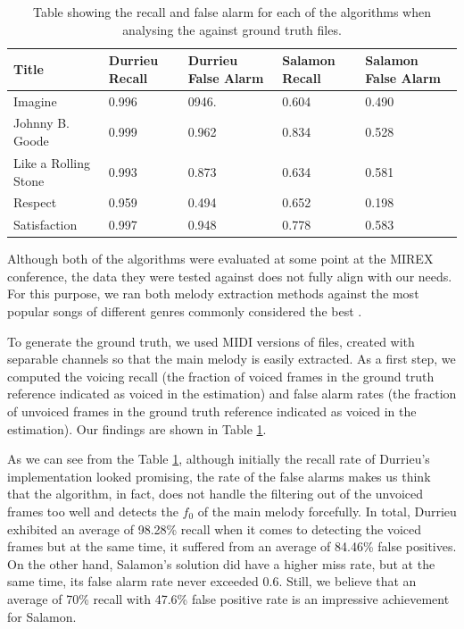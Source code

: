 \begin{table}[b]
\begin{center}
\begin{tabular} {| p{5cm}| p{1.75cm} | p{1.75cm} | p{1.75cm} | p{1.75cm} |} \hline
Title 	& Durrieu Recall & Durrieu False Alarm 	& Salamon Recall 	& Salamon False Alarm \\ \hline \hline
Imagine						& 0.996		& 0946.		& 0.604			& 0.490		\\	\hline
Johnny B. Goode		& 0.999		& 0.962		& 0.834			& 0.528		\\ 	\hline
Like a Rolling Stone	& 0.993		& 0.873		& 0.634			& 0.581		\\ 	\hline
Respect						& 0.959		& 0.494		& 0.652			& 0.198		\\ 	\hline
Satisfaction				& 0.997		& 0.948		& 0.778			& 0.583		\\	\hline
\end{tabular}
\caption{Table showing the recall and false alarm for each of the algorithms when analysing the against ground truth files.}
\label{table:voicedunvoiced}
\end{center}
\end{table}

Although both of the algorithms were evaluated at some point at the MIREX conference, the data they were tested against does not fully align with our needs. For this purpose, we ran both melody extraction methods against the most popular songs of different genres commonly considered the best \cite{toplists}.

To generate the ground truth, we used MIDI versions of files, created with separable channels so that the main melody is easily extracted. As a first step, we computed the voicing recall (the fraction of voiced frames in the ground truth reference indicated as voiced in the estimation) and false alarm rates (the fraction of unvoiced frames in the ground truth reference indicated as voiced in the estimation).
Our findings are shown in Table \ref{table:voicedunvoiced}.


As we can see from the Table \ref{table:voicedunvoiced}, although initially the recall rate of Durrieu's implementation looked promising, the rate of the false alarms makes us think that the algorithm, in fact, does not handle the filtering out of the unvoiced frames too well and detects the $f_{0}$ of the main melody forcefully. In total, Durrieu exhibited an average of 98.28\% recall when it comes to detecting the voiced frames but at the same time, it suffered from an average of 84.46\% false positives. On the other hand, Salamon's solution did have a higher miss rate, but at the same time, its false alarm rate never exceeded 0.6. Still, we believe that an average of 70\% recall with 47.6\% false positive rate is an impressive achievement for Salamon.

